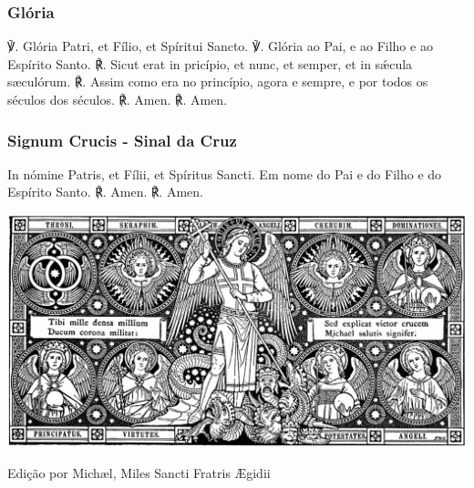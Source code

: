 \pagebreak[3]\subsubsection{Glória}
\begin{paracol}{2}
℣. Glória Patri, et Fílio, et Spíritui Sancto.
\switchcolumn
℣. Glória ao Pai, e ao Filho e ao Espírito Santo.
\switchcolumn*
℟. Sicut erat in pricípio, et nunc, et semper, et in sǽcula sæculórum.
\switchcolumn
℟. Assim como era no princípio, agora e sempre, e por todos os séculos dos séculos.
\switchcolumn*
℟. Amen.
\switchcolumn
℟. Amen.
\end{paracol}

\emph{}

\emph{}

\subsubsection{Signum Crucis - Sinal da Cruz}
\begin{paracol}{2}
\cruz In nómine Patris, et Fílii, et Spíritus Sancti.
\switchcolumn
\cruz Em nome do Pai e do Filho e do Espírito Santo.
\switchcolumn*
℟. Amen.
\switchcolumn
℟. Amen.
\end{paracol}

\emph{}

\tableofcontents

\mbox{}
\vfill
\begin{nscenter}
\includegraphics[width=1\textwidth,height=1\textheight,keepaspectratio]{smiguel}
\end{nscenter}

\mbox{}
\vfill
\begin{nscenter}
  Edição por Michæl, Miles Sancti Fratris Ægidii
\end{nscenter}